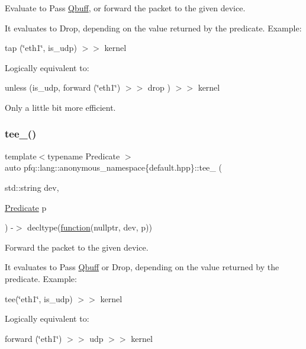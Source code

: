 Evaluate to {\ttfamily Pass} \hyperlink{structpfq_1_1lang_1_1Qbuff}{Qbuff}, or forward the packet to the given device. 

It evaluates to {\ttfamily Drop}, depending on the value returned by the predicate. Example\+:

tap (\char`\"{}eth1\char`\"{}, is\+\_\+udp) $>$$>$ kernel

Logically equivalent to\+:

unless (is\+\_\+udp, forward (\char`\"{}eth1\char`\"{}) $>$$>$ drop ) $>$$>$ kernel

Only a little bit more efficient. \mbox{\label{namespacepfq_1_1lang_1_1anonymous__namespace_02default_8hpp_03_a94260a88b04b7d42e471b954ba48d617}} 
\subsubsection{\texorpdfstring{tee\+\_\+()}{tee\_()}}
{\footnotesize\ttfamily template$<$typename Predicate $>$ \\
auto pfq\+::lang\+::anonymous\+\_\+namespace\{default.\+hpp\}\+::tee\+\_\+ (\begin{DoxyParamCaption}\item[{std\+::string}]{dev,  }\item[{\hyperlink{structpfq_1_1lang_1_1Predicate}{Predicate}}]{p }\end{DoxyParamCaption}) -\/$>$ decltype(\hyperlink{namespacepfq_1_1lang_a1a4638059d700ae08d0ca63886ff2bb3}{function}(nullptr, dev, p))
        }



Forward the packet to the given device. 

It evaluates to {\ttfamily Pass} \hyperlink{structpfq_1_1lang_1_1Qbuff}{Qbuff} or {\ttfamily Drop}, depending on the value returned by the predicate. Example\+:

tee(\char`\"{}eth1\char`\"{}, is\+\_\+udp) $>$$>$ kernel

Logically equivalent to\+:

forward (\char`\"{}eth1\char`\"{}) $>$$>$ udp $>$$>$ kernel

